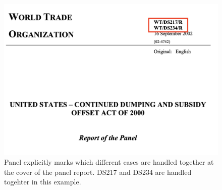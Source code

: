 \begin{figure}[h]
    \centering
    \includegraphics[scale=0.35]{Data/pngs/linked_cases.png}
    \caption{
        Panel explicitly marks which different cases are handled together at the cover of the panel report. DS217 and DS234 are handled togehter in this example.
        }
    \label{fig:linked-cases}
\end{figure}



